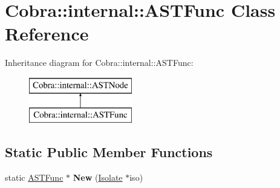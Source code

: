 \hypertarget{class_cobra_1_1internal_1_1_a_s_t_func}{\section{Cobra\+:\+:internal\+:\+:A\+S\+T\+Func Class Reference}
\label{class_cobra_1_1internal_1_1_a_s_t_func}
}
Inheritance diagram for Cobra\+:\+:internal\+:\+:A\+S\+T\+Func\+:\begin{figure}[H]
\begin{center}
\leavevmode
\includegraphics[height=2.000000cm]{class_cobra_1_1internal_1_1_a_s_t_func}
\end{center}
\end{figure}
\subsection*{Static Public Member Functions}
\begin{DoxyCompactItemize}
\item 
\hypertarget{class_cobra_1_1internal_1_1_a_s_t_func_af98bcafb9fcd34d6c68ab7ca95c45ca0}{static \hyperlink{class_cobra_1_1internal_1_1_a_s_t_func}{A\+S\+T\+Func} $\ast$ {\bfseries New} (\hyperlink{class_cobra_1_1internal_1_1_isolate}{Isolate} $\ast$iso)}\label{class_cobra_1_1internal_1_1_a_s_t_func_af98bcafb9fcd34d6c68ab7ca95c45ca0}

\end{DoxyCompactItemize}
